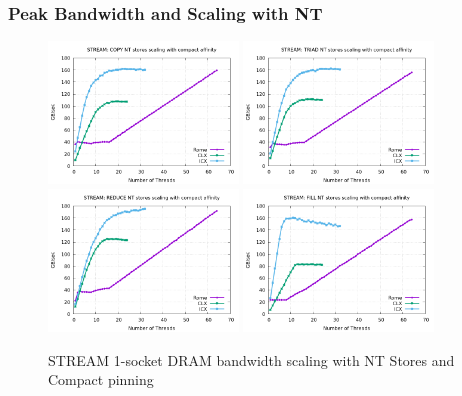 \documentclass{article}
\begin{document}
\subsubsection{Peak Bandwidth and Scaling with NT}

\begin{figure}[!ht]
    \centering
    \includegraphics[width=0.45\textwidth]{../mem_bw_scale/mb_scale_compact_Copy_nt}
    \includegraphics[width=0.45\textwidth]{../mem_bw_scale/mb_scale_compact_Triad_nt}
    \includegraphics[width=0.45\textwidth]{../mem_bw_scale/mb_scale_compact_Reduce_nt}
    \includegraphics[width=0.45\textwidth]{../mem_bw_scale/mb_scale_compact_Fill_nt}
    \caption{STREAM 1-socket DRAM bandwidth scaling with NT Stores and Compact pinning}
    \label{figure:mem_bw_scale_compact_nt}
\end{figure}
\end{document}

